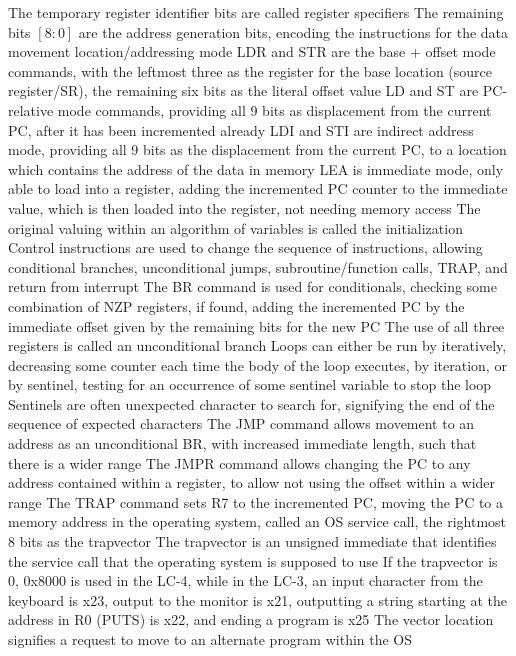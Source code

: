 \documentclass[11 pt, twoside]{article}
\newenvironment{outline*}
{
	\begin{outline}[enumerate]
	}
	{\end{outline}
}
\begin{document}
\begin{outline*}
\3 The temporary register identifier bits are called register specifiers
\3 The remaining bits $[8:0]$ are the address generation bits, encoding the instructions for the data movement location/addressing mode
\3 LDR and STR are the base + offset mode commands, with the leftmost three as the register for the base location (source register/SR), the remaining six bits as the literal offset value
\3 LD and ST are PC-relative mode commands, providing all 9 bits as displacement from the current PC, after it has been incremented already
\3 LDI and STI are indirect address mode, providing all 9 bits as the displacement from the current PC, to a location which contains the address of the data in memory
\3 LEA is immediate mode, only able to load into a register, adding the incremented PC counter to the immediate value, which is then loaded into the register, not needing memory access
\2 The original valuing within an algorithm of variables is called the initialization
\1 Control instructions are used to change the sequence of instructions, allowing conditional branches, unconditional jumps, subroutine/function calls, TRAP, and return from interrupt
\2 The BR command is used for conditionals, checking some combination of NZP registers, if found, adding the incremented PC by the immediate offset given by the remaining bits for the new PC 
\3 The use of all three registers is called an unconditional branch
\3 Loops can either be run by iteratively, decreasing some counter each time the body of the loop executes, by iteration, or by sentinel, testing for an occurrence of some sentinel variable to stop the loop
\4 Sentinels are often unexpected character to search for, signifying the end of the sequence of expected characters
\2 The JMP command allows movement to an address as an unconditional BR, with increased immediate length, such that there is a wider range
\3 The JMPR command allows changing the PC to any address contained within a register, to allow not using the offset within a wider range
\2 The TRAP command sets R7 to the incremented PC, moving the PC to a memory address in the operating system, called an OS service call, the rightmost 8 bits as the trapvector
\3 The trapvector is an unsigned immediate that identifies the service call that the operating system is supposed to use
\3 If the trapvector is 0, 0x8000 is used in the LC-4, while in the LC-3, an input character from the keyboard is x23, output to the monitor is x21, outputting a string starting at the address in R0 (PUTS) is x22, and ending a program is x25
\4 The vector location signifies a request to move to an alternate program within the OS

\end{outline*}
\end{document}
